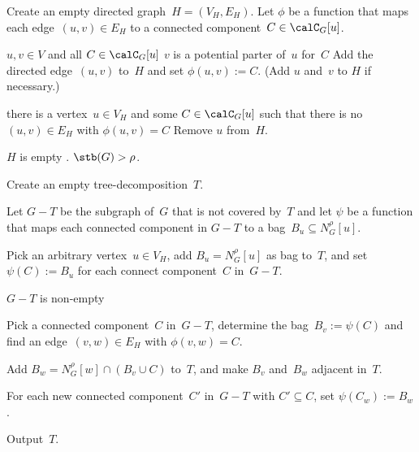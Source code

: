 \begin{algorithm}
    [!htb]
    \caption
    {%
        Constructs, for a given graph~$G = (V, E)$ with strong tree-breadth~$\rho$, a tree-decomposition~$T$ with breadth~$\rho$.
    }
    \label{algo:weakTB}

Create an empty directed graph~$H = (V_H, E_H)$.
Let $\phi$ be a function that maps each edge~$(u, v) \in E_H$ to a connected component~$C \in \calC_G[u]$.
\label{line:weakTB_initH}

\ForEach
{%
    \( u, v \in V \) and all \( C \in \calC_G[u] \)
}
{%
    \If
    {%
        \( v \) is a potential parter of~\( u \) for~\( C \)%
        \label{line:weakTB_CheckUV}
    }
    {%
        Add the directed edge~$(u, v)$ to~$H$ and set $\phi(u, v) := C$.
        (Add $u$ and~$v$ to $H$ if necessary.)
        \label{line:weakTB_AddUV}
    }
}

\While
{%
    there is a vertex~\( u \in V_H \) and some \( C \in \calC_G[u] \) such that there is no \( (u, v) \in E_H \) with \( \phi(u, v) = C \)
    \label{line:weakTB_RemoveUloop}
}
{
    Remove $u$ from~$H$.
    \label{line:weakTB_RemoveU}
}

\If
{%
    \( H \) is empty
}
{%
    .
    $\stb(G) > \rho$.
}

Create an empty tree-decomposition~$T$.
\label{line:weakTB_initT}

Let $G - T$ be the subgraph of~$G$ that is not covered by~$T$ and let $\psi$ be a function that maps each connected component in $G - T$ to a bag~$B_u \subseteq N_G^\rho[u]$.

Pick an arbitrary vertex~$u \in V_H$, add $B_u = N_G^\rho[u]$ as bag to~$T$, and set $\psi(C) := B_u$ for each connect component~$C$ in~$G - T$.
\label{line:weakTB_addFirstBag}

\While
{%
    \( G - T \) is non-empty
    \label{line:weakTB_Tloop}
}
{%
    Pick a connected component~$C$ in~$G - T$, determine the bag~$B_v := \psi(C)$ and find an edge~$(v, w) \in E_H$ with $\phi(v, w) = C$.
    \label{line:weakTB_PickNextBag}

    Add $B_w = N_G^\rho[w] \cap (B_v \cup C)$ to~$T$, and make $B_v$ and~$B_w$ adjacent in~$T$.
    \label{line:weakTB_AddBag}

    For each new connected component~$C'$ in~$G - T$ with $C' \subseteq C$, set $\psi(C_w) := B_w$.
    \label{line:weakTB_UpdateF}
}

Output~$T$.
\end{algorithm}

